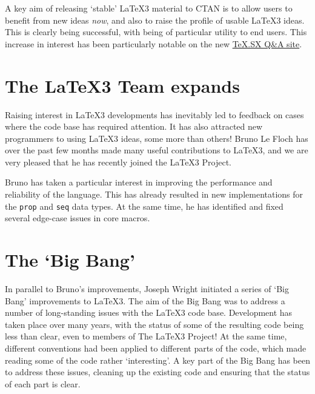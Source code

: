 \documentclass{ltnews}
\begin{document}
\maketitle

\noindent
A key aim of releasing `stable' \LaTeX3 material to CTAN is to allow users to
benefit from new ideas \emph{now}, and also to raise the profile of usable
\LaTeX3 ideas. This is clearly being successful, with  being of
particular utility to end users. This increase in interest has been
particularly notable on the new
\href{http://tex.stackexchange.com/}{TeX.SX Q\&A site}.

\section{The \LaTeX3 Team expands}

Raising interest in \LaTeX3 developments has inevitably led to feedback on
cases where the code base has required attention. It has also attracted new
programmers to using \LaTeX3 ideas, some more than others! Bruno Le Floch has
over the past few months made many useful contributions to \LaTeX3, and we are
very pleased that he has recently joined the \LaTeX3 Project.

Bruno has taken a particular interest in improving the performance and
reliability of the  language. This has already resulted in new
implementations for the \texttt{prop} and \texttt{seq} data types. At the same
time, he has identified and fixed several edge-case issues in core 
macros.

\section{The `Big Bang'}

In parallel to Bruno's improvements, Joseph Wright initiated a series of `Big
Bang' improvements to \LaTeX3. The aim of the Big Bang was to address a number
of long-standing issues with the \LaTeX3 code base. Development has taken place
over many years, with the status of some of the resulting code being less
than clear, even to members of The \LaTeX3 Project! At the same time, different
conventions had been applied to different parts of the code, which made reading
some of the code rather `interesting'. A key part of the Big Bang has been to
address these issues, cleaning up the existing code and ensuring that the
status of each part is clear.
\end{document}
